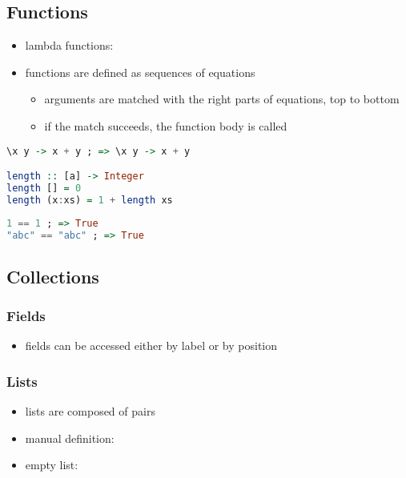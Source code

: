 \documentclass[a4paper,landscape,10pt]{article}
\begin{document}
\begin{multicols*}{2}
  \missing

  \subsection{Functions}

  \begin{itemize}
    \item lambda functions: 
    \item functions are defined as sequences of equations
          \begin{itemize}
            \item arguments are matched with the right parts of equations, top to bottom
            \item if the match succeeds, the function body is called
          \end{itemize}
  \end{itemize}

  \begin{lstlisting}[language=Haskell]
\x y -> x + y ; => \x y -> x + y

length :: [a] -> Integer
length [] = 0
length (x:xs) = 1 + length xs
\end{lstlisting}

  \begin{lstlisting}[language=Haskell]
1 == 1 ; => True
"abc" == "abc" ; => True
\end{lstlisting}

  \subsection{Collections}

  \subsubsection{Fields}

  \begin{itemize}
    \item fields can be accessed either by label or by position
  \end{itemize}

  \subsubsection{Lists}

  \begin{itemize}
    \item lists are composed of pairs
    \item manual definition: \ihaskell{[1, 2, 3]}
    \item empty list: \ihaskell{[]}
  \end{itemize}


\end{multicols*}
\end{document}
